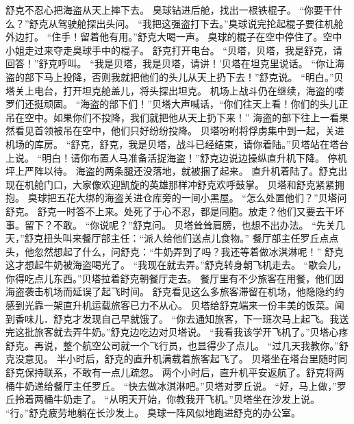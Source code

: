 \documentclass[a4paper,12pt,UTF8,twoside]{ctexbook}
\begin{document}
        舒克不忍心把海盗从天上摔下去。 
        臭球钻进后舱，找出一根铁棍子。 
        “你要干什么？”舒克从驾驶舱探出头问。 
        “我把这强盗打下去。”臭球说完抡起棍子要往机舱外边打。 
        “住手！留着他有用。”舒克大喝一声。 
        臭球的棍子在空中停住了。空中小姐走过来夺走臭球手中的棍子。 
        舒克打开电台。 
        “贝塔，贝塔，我是舒克，请回答！”舒克呼叫。 
        “我是贝塔，我是贝塔，请讲！’贝塔在坦克里说话。 
        “你让海盗的部下马上投降，否则我就把他们的头儿从天上扔下去！”舒克说。 
        “明白。”贝塔关上电台，打开坦克舱盖儿，将头探出坦克。 
        机场上战斗仍在继续，海盗的喽罗们还挺顽固。 
        “海盗的部下们！”贝塔大声喊话，“你们往天上看！你们的头儿正吊在空中。如果你们不投降，我们就把他从天上扔下来！” 
        海盗的部下往上一看果然看见首领被吊在空中，他们只好纷纷投降。 
        贝塔吩咐将俘虏集中到一起，关进机场的库房。 
        “舒克，舒克，我是贝塔，战斗已经结束，请你着陆。”贝塔站在塔台上说。 
        “明白！请你布置人马准备活捉海盗！”舒克边说边操纵直升机下降。 
        停机坪上严阵以待。 
        海盗的两条腿还没落地，就被捆了起来。 
        直升机着陆了。舒克出现在机舱门口，大家像欢迎凯旋的英雄那样冲舒克欢呼鼓掌。 
        贝塔和舒克紧紧拥抱。 
        臭球把五花大绑的海盗关进仓库旁的一间小黑屋。 
        “怎么处置他们？”贝塔问舒克。 
        舒克一时答不上来。处死了于心不忍，都是同胞。放走？他们又要去干坏事。留下？不敢。 
        “你说呢？”舒克问。 
        贝塔耸耸肩膀，也想不出办法。 
        “先关几天，”舒克扭头叫来餐厅部主任：“派人给他们送点儿食物。” 
        餐厅部主任罗丘点点头，他忽然想起了什么，问舒克：“牛奶弄到了吗？我还等着做冰淇淋呢！” 
        舒克这才想起牛奶被海盗喝光了。 
        “我现在就去弄。”舒克转身朝飞机走去。 
        “歇会儿，你得吃点儿东西。”贝塔拉着舒克朝餐厅走去。 
        餐厅里有不少旅客在用餐，他们因海盗袭击机场而延误了起飞时间。 
        舒克看见这么多旅客滞留在机场，他隐隐约约感到光靠一架直升机运载旅客已力不从心。 
        贝塔给舒克端来一份丰美的饭菜。闻到香味儿．舒克才发现自己早就饿了。 
        “你去通知旅客，下一班次马上起飞。我送完这批旅客就去弄牛奶。”舒克边吃边对贝塔说。 
        “我看我该学开飞机了。”贝塔心疼舒克。再说，整个航空公司就一个飞行员，也显得少了点儿。 
        “过几天我教你。”舒克没意见。 
        半小时后，舒克的直升机满载着旅客起飞了。 
        贝塔坐在塔台里随时同舒克保持联系，不敢有一点儿疏忽。 
        两个小时后，直升机平安返航了。舒克将两桶牛奶递给餐厅主任罗丘。 
        “快去做冰淇淋吧。”贝塔对罗丘说。 
        “好，马上做，”罗丘拎着两桶牛奶走了。 
        “从明天开始，你教我开飞机。”贝塔坐在沙发上说。 
        “行。”舒克疲劳地躺在长沙发上。 
        臭球一阵风似地跑进舒克的办公室。 
\end{document}

